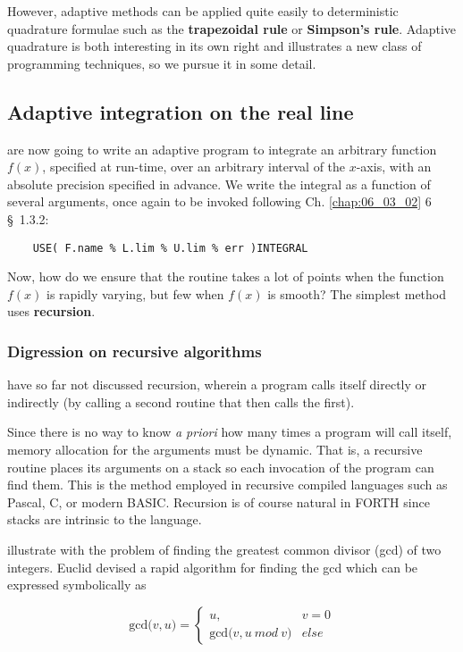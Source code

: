 However, adaptive methods can be applied quite easily to deterministic quadrature formulae such as the \textbf{trapezoidal rule} or \textbf{Simpson’s rule}. Adaptive quadrature is both interesting in its own right and illustrates a new class of programming techniques, so we pursue it in some detail.

\subsection{Adaptive integration on the real line}
 are now going to write an adaptive program to integrate an arbitrary function $f(x)$, specified at run-time, over an arbitrary interval of the $x$-axis, with an absolute precision specified in advance. We write the integral as a function of several arguments, once again to be invoked following Ch. \ref{chap:06_03_02} 6 \S\ 1.3.2:

\begin{lstlisting}
    USE( F.name % L.lim % U.lim % err )INTEGRAL
\end{lstlisting}

Now, how do we ensure that the routine takes a lot of points when the function $f(x)$ is rapidly varying, but few when $f(x)$ is smooth? The simplest method uses \textbf{recursion}.

\subsubsection{Digression on recursive algorithms}
 have so far not discussed recursion, wherein a program calls itself directly or indirectly (by calling a second routine that then calls the first).

Since there is no way to know \textit{a priori} how many times a program will call itself, memory allocation for the arguments must be dynamic. That is, a recursive routine places its arguments on a stack so each invocation of the program can find them. This is the method employed in recursive compiled languages such as Pascal, C, or modern BASIC. Recursion is of course natural in FORTH since stacks are intrinsic to the language.

 illustrate with the problem of finding the greatest common divisor (gcd) of two integers. Euclid devised a rapid algorithm for finding the gcd which can be expressed symbolically as

\begin{equation}
    \text{gcd(}v, u \text{)} =
    \begin{cases}
        u, & v= 0 \\
        \text{gcd(}v, u\ mod\ v\text{)} & else
    \end{cases}
\end{equation}
    
